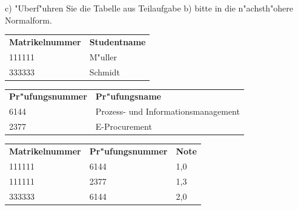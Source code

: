\noindent
c) "Uberf"uhren Sie die Tabelle aus Teilaufgabe b) bitte in die n"achsth"ohere Normalform.\\


\begin{tabular}{ l l }
    \hline
    \rowcolor{LightSlateGrey}
    \textbf{Matrikelnummer} & \textbf{Studentname} \\
    111111                  & M"uller\\
    333333                  & Schmidt\\
\end{tabular}

\vspace{1cm}

\begin{tabular}{ l l }
    \hline
    \rowcolor{LightSlateGrey}
    \textbf{Pr"ufungsnummer}    & \textbf{Pr"ufungsname}\\
    6144                        & Prozess- und Informationsmanagement\\
    2377                        & E-Procurement\\
\end{tabular}

\vspace{1cm}

\begin{tabular}{ l l l }
    \hline
    \rowcolor{LightSlateGrey}
    \textbf{Matrikelnummer} & \textbf{Pr"ufungsnummer}  & \textbf{Note}\\
    111111                  & 6144                      & 1,0\\
    111111                  & 2377                      & 1,3\\
    333333                  & 6144                      & 2,0\\
\end{tabular}


